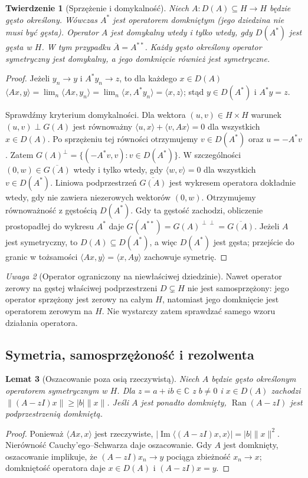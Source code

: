 \documentclass[11pt,a4paper]{article}
\numberwithin{equation}{section}
\theoremstyle{plain}
\newtheorem{twierdzenie}{Twierdzenie}[section]
\newtheorem{lemat}[twierdzenie]{Lemat}
\theoremstyle{definition}
\theoremstyle{remark}
\newtheorem{uwaga}[twierdzenie]{Uwaga}
\newcommand{\C}{\mathbb C}
\begin{document}
\begin{twierdzenie}[Sprzężenie i domykalność]
\label{thm:closable-adjoint33}
Niech $A:D(A)\subseteq H\to H$ będzie gęsto określony.
Wówczas $A^*$ jest operatorem domkniętym (jego dziedzina
nie musi być gęsta). Operator $A$ jest domykalny wtedy i tylko wtedy,
gdy $D(A^*)$ jest gęsta w $H$. W tym przypadku
$\overline A=A^{**}$. Każdy gęsto określony operator symetryczny
jest domykalny, a jego domknięcie również jest symetryczne.
\end{twierdzenie}
\begin{proof}
Jeżeli $y_n\to y$ i $A^*y_n\to z$, to dla każdego $x\in D(A)$
$\langle Ax,y\rangle=\lim_n\langle Ax,y_n\rangle
=\lim_n\langle x,A^*y_n\rangle=\langle x,z\rangle$;
stąd $y\in D(A^*)$ i $A^*y=z$.

Sprawdźmy kryterium domykalności. Dla wektora $(u,v)\in H\times H$
warunek $(u,v)\perp G(A)$ jest równoważny
$\langle u,x\rangle+\langle v,Ax\rangle=0$ dla wszystkich
$x\in D(A)$. Po sprzężeniu tej równości otrzymujemy
$v\in D(A^*)$ oraz $u=-A^*v$. Zatem
$G(A)^\perp=\{(-A^*v,v):v\in D(A^*)\}$.
W szczególności $(0,w)\in\overline{G(A)}$ wtedy i tylko wtedy,
gdy $\langle w,v\rangle=0$ dla wszystkich $v\in D(A^*)$.
Liniowa podprzestrzeń $\overline{G(A)}$ jest wykresem operatora
dokładnie wtedy, gdy nie zawiera niezerowych wektorów $(0,w)$.
Otrzymujemy równoważność z gęstością $D(A^*)$.
Gdy ta gęstość zachodzi, obliczenie prostopadłej do wykresu
$A^*$ daje $G(A^{**})=G(A)^{\perp\perp}=\overline{G(A)}$.
Jeżeli $A$ jest symetryczny, to $D(A)\subseteq D(A^*)$, a więc
$D(A^*)$ jest gęsta; przejście do granic w tożsamości
$\langle Ax,y\rangle=\langle x,Ay\rangle$ zachowuje symetrię.
\end{proof}

\begin{uwaga}[Operator ograniczony na niewłaściwej dziedzinie]
Nawet operator zerowy na gęstej właściwej podprzestrzeni $D\subsetneq H$
nie jest samosprzężony: jego operator sprzężony jest zerowy na całym
$H$, natomiast jego domknięcie jest operatorem zerowym na $H$.
Nie wystarczy zatem sprawdzać samego wzoru działania operatora.
\end{uwaga}

\subsection{Symetria, samosprzężoność i rezolwenta}

\begin{lemat}[Oszacowanie poza osią rzeczywistą]
\label{lem:symmetric-resolvent33}
Niech $A$ będzie gęsto określonym operatorem symetrycznym w $H$.
Dla $z=a+ib\in\C$ z $b\ne0$ i $x\in D(A)$ zachodzi
$\|(A-zI)x\|\ge |b|\|x\|$. Jeśli $A$ jest ponadto domknięty,
$\operatorname{Ran}(A-zI)$ jest podprzestrzenią domkniętą.
\end{lemat}
\begin{proof}
Ponieważ $\langle Ax,x\rangle$ jest rzeczywiste,
$|\operatorname{Im}\langle(A-zI)x,x\rangle|=|b|\|x\|^2$.
Nierówność Cauchy'ego--Schwarza daje oszacowanie.
Gdy $A$ jest domknięty, oszacowanie implikuje, że
$(A-zI)x_n\to y$ pociąga zbieżność $x_n\to x$;
domkniętość operatora daje $x\in D(A)$ i $(A-zI)x=y$.
\end{proof}
\end{document}
